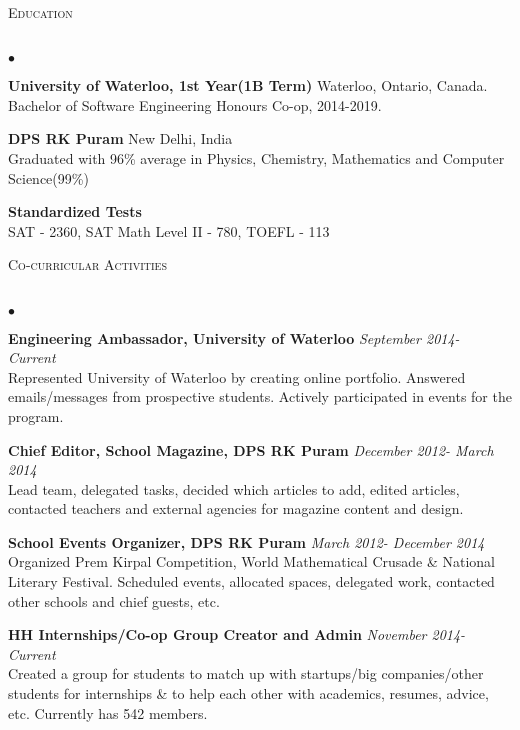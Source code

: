 \documentclass{article}
\newcommand{\lineunder}{\vspace*{-8pt} \\ \hspace*{-18pt} \hrulefill \\}
\newcommand{\header}[1]{{\hspace*{-15pt}\vspace*{6pt} \textsc{#1}} \vspace*{-6pt} \lineunder}
\newenvironment{achievements}{\begin{list}{$\bullet$}{\topsep 0pt \itemsep -1.5pt \leftmargin 5pt}}{\vspace*{4pt}\end{list}}
\begin{document}
\vspace{7pt}

\header{\normalsize Education}
\begin{achievements}
\item \textbf{University of Waterloo, 1st Year(1B Term)} Waterloo, Ontario, Canada. \\ Bachelor of Software Engineering Honours Co-op, 2014-2019. 
\item \textbf{DPS RK Puram} New Delhi, India \\ Graduated with 96\% average in Physics, Chemistry, Mathematics and Computer Science(99\%)
\item \textbf{Standardized Tests} \\ SAT - 2360, SAT Math Level II - 780, TOEFL - 113
\end{achievements}

\vspace{7pt}

\header{\normalsize Co-curricular Activities}
\begin{achievements}
\item \textbf{Engineering Ambassador, University of Waterloo} \hfill \textit {September 2014- Current}
\\ Represented University of Waterloo by creating online portfolio. Answered emails/messages from prospective students. Actively participated in events for the program.
\item \textbf{Chief Editor, School Magazine, DPS RK Puram} \hfill \textit {December 2012- March 2014}
\\ Lead team, delegated tasks, decided which articles to add, edited articles, contacted teachers and external agencies for magazine content and design.
\item \textbf{School Events Organizer, DPS RK Puram}  \hfill \textit {March 2012- December 2014}
\\ Organized Prem Kirpal Competition, World Mathematical Crusade \& National Literary Festival. Scheduled events, allocated spaces, delegated work, contacted other schools and chief guests, etc.
\item \textbf{HH Internships/Co-op Group Creator and Admin} \hfill \textit {November 2014- Current}
\\ Created a group for students to match up with startups/big companies/other students for internships \& to help each other with academics, resumes, advice, etc. Currently has 542 members.
\end{achievements}
\end{document}
